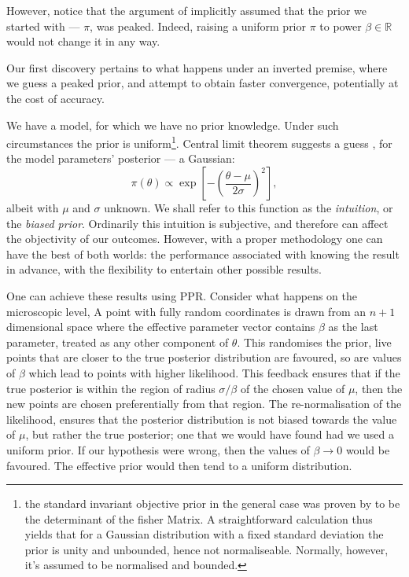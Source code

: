 \documentclass[usenatbib]{mnras}
\begin{document}
However, notice that the argument of \citeauthor{chen-ferroz-hobson}
implicitly assumed that the prior we started with --- \(\pi\), was
peaked. Indeed, raising a uniform prior \(\pi\) to power \(\beta \in
   \mathbb{R}\) would not change it in any way.

Our first discovery pertains to what happens under an inverted
premise, where we guess a peaked prior, and attempt to obtain
faster convergence, potentially at the cost of accuracy.

We have a model, for which we have no prior knowledge. Under such
circumstances the prior is uniform\footnote{the standard invariant
objective prior in the general case was proven by
\cite{JeffreysPrior} to be the determinant of the fisher Matrix. A
straightforward calculation thus yields that for a Gaussian
distribution with a fixed standard deviation the prior is unity and
unbounded, hence not normaliseable. Normally, however, it's assumed
to be normalised and bounded.}. Central limit theorem suggests a guess ,
for the model parameters' posterior --- a Gaussian:
\begin{equation}
 \pi (\theta) \propto \exp \left[-\left(\frac{\theta - \mu}{2\sigma}\right)^{2} \right],
\end{equation}
albeit with \(\mu\) and \(\sigma\) unknown. We shall refer to
this function as the \emph{intuition}, or the \emph{biased prior}. Ordinarily
this intuition is subjective, and therefore can affect the
objectivity of our outcomes. However, with a proper methodology one
can have the best of both worlds: the performance associated with
knowing the result in advance, with the flexibility to entertain
other possible results.

One can achieve these results using PPR. Consider what happens on
the microscopic level, A point with fully random coordinates is
drawn from an \(n+1\) dimensional space where the effective
parameter vector contains \(\beta\) as the last parameter, treated
as any other component of \(\theta\). This randomises the prior, live
points that are closer to the true posterior distribution are
favoured, so are values of \(\beta\) which lead to points with
higher likelihood.  This feedback ensures that if the true
posterior is within the region of radius \(\sigma / \beta\) of the
chosen value of \(\mu\), then the new points are chosen
preferentially from that region. The re-normalisation of the
likelihood, ensures that the posterior distribution is not biased
towards the value of \(\mu\), but rather the true posterior; one
that we would have found had we used a uniform prior. If our
hypothesis were wrong, then the values of \(\beta \rightarrow 0\)
would be favoured. The effective prior would then tend to a uniform
distribution.
\end{document}
